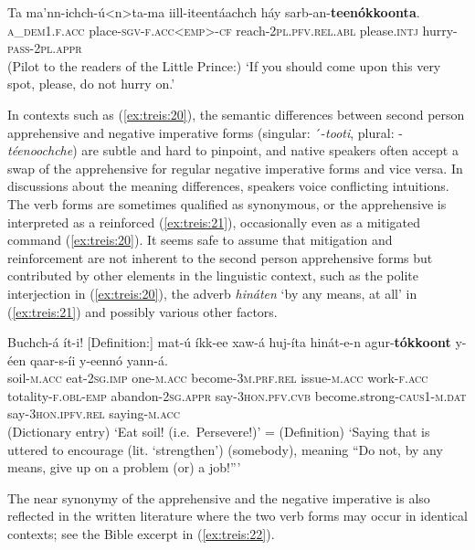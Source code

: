 \documentclass[output=paper,colorlinks,citecolor=brown,]{langscibook}
\begin{document}
\ea\label{ex:treis:20} 
\gll Ta	ma'nn-ichch-ú<n>ta-ma	iill-iteentáachch háy			sarb-an-\textbf{teenókkoonta}. \\
\textsc{a\_dem1.f.acc} place-\textsc{sgv-f.acc<emp>-cf}	reach-\textsc{2pl.pfv.rel.abl} please.\textsc{intj}	hurry-\textsc{pass-2pl.appr}\\
\glt (Pilot to the readers of the Little Prince:) `If you should come upon this very spot, please, do not hurry on.' \citep[95]{Saint-Exupéry2018}
\z 

 In contexts such as (\ref{ex:treis:20}), the semantic differences between second person apprehensive and negative imperative forms (singular: ´-\textit{tooti}, plural: \nobreakdash-\textit{téenoochche}) are subtle and hard to pinpoint, and native speakers often accept a swap of the apprehensive for regular negative imperative forms and vice versa. In discussions about the meaning differences, speakers voice conflicting intuitions. The verb forms are sometimes qualified as synonymous, or the apprehensive is interpreted as a reinforced (\ref{ex:treis:21}), occasionally even as a mitigated command (\ref{ex:treis:20}). It seems safe to assume that mitigation and reinforcement are not inherent to the second person apprehensive forms but contributed by other elements in the linguistic context, such as the polite interjection in (\ref{ex:treis:20}), the adverb \textit{hináten} `by any means, at all' in (\ref{ex:treis:21}) and possibly various other factors. 

\ea\label{ex:treis:21} 
\gll Buchch-á ít-i!	\textnormal{[Definition:]} mat-ú íkk-ee xaw-á huj-íta hinát-e-n agur-\textbf{tókkoont} y-éen qaar-s-íi		y-eennó yann-á. \\
soil-\textsc{m.acc} eat-\textsc{2sg.imp} {} one-\textsc{m.acc}	become-\textsc{3m.prf.rel}	issue-\textsc{m.acc} work-\textsc{f.acc} totality-\textsc{f.obl-emp}	abandon-\textsc{2sg.appr}		say-\textsc{3hon.pfv.cvb} become.strong-\textsc{caus1-m.dat}	say-\textsc{3hon.ipfv.rel} saying-\textsc{m.acc}\\
\glt (Dictionary entry) `Eat soil! (i.e.\  Persevere!)' = (Definition) `Saying that is uttered to encourage (lit. `strengthen') (somebody), meaning ``Do not, by any means, give up on a problem (or) a job!''' \citep[158]{Alemu2016}
\z 

The near synonymy of the apprehensive and the negative imperative is also reflected in the written  literature where the two verb forms may occur in identical contexts; see the Bible excerpt in (\ref{ex:treis:22}).
\end{document}
